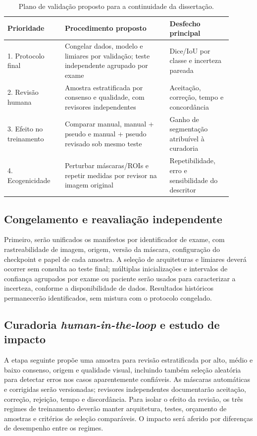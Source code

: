 \documentclass[12pt]{article}
\begin{document}
\begin{table}[!htbp]
\centering
\small
\caption[Plano experimental para continuidade da dissertação]{Plano de validação proposto para a continuidade da dissertação.}
\label{tab:plano_validacao}
\begin{tabular}{p{0.23\linewidth}p{0.42\linewidth}p{0.25\linewidth}}
\toprule
\textbf{Prioridade} & \textbf{Procedimento proposto} & \textbf{Desfecho principal} \\
\midrule
1. Protocolo final & Congelar dados, modelo e limiares por validação; teste independente agrupado por exame & Dice/IoU por classe e incerteza pareada \\
2. Revisão humana & Amostra estratificada por consenso e qualidade, com revisores independentes & Aceitação, correção, tempo e concordância \\
3. Efeito no treinamento & Comparar manual, manual + pseudo e manual + pseudo revisado sob mesmo teste & Ganho de segmentação atribuível à curadoria \\
4. Ecogenicidade & Perturbar máscaras/ROIs e repetir medidas por revisor na imagem original & Repetibilidade, erro e sensibilidade do descritor \\
\bottomrule
\end{tabular}
\end{table}

\subsection{Congelamento e reavaliação independente}
Primeiro, serão unificados os manifestos por identificador de exame, com rastreabilidade de imagem, origem, versão da máscara, configuração do checkpoint e papel de cada amostra. A seleção de arquiteturas e limiares deverá ocorrer sem consulta ao teste final; múltiplas inicializações e intervalos de confiança agrupados por exame ou paciente serão usados para caracterizar a incerteza, conforme a disponibilidade de dados. Resultados históricos permanecerão identificados, sem mistura com o protocolo congelado.

\subsection{Curadoria \textit{human-in-the-loop} e estudo de impacto}
A etapa seguinte propõe uma amostra para revisão estratificada por alto, médio e baixo consenso, origem e qualidade visual, incluindo também seleção aleatória para detectar erros nos casos aparentemente confiáveis. As máscaras automáticas e corrigidas serão versionadas; revisores independentes documentarão aceitação, correção, rejeição, tempo e discordância. Para isolar o efeito da revisão, os três regimes de treinamento deverão manter arquitetura, testes, orçamento de amostras e critérios de seleção comparáveis. O impacto será aferido por diferenças de desempenho entre os regimes.
\end{document}
